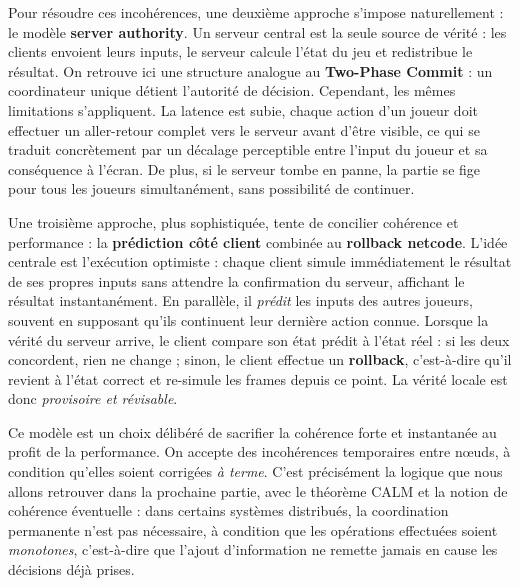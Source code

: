\documentclass[12pt,a4paper]{article}
\begin{document}
\vspace{0.25cm}

Pour résoudre ces incohérences, une deuxième approche s'impose naturellement : le modèle \textbf{server authority}\cite{Gambetta}. Un serveur central est la seule source de vérité : les clients envoient leurs inputs, le serveur calcule l'état du jeu et redistribue le résultat. On retrouve ici une structure analogue au \textbf{Two-Phase Commit} : un coordinateur unique détient l'autorité de décision. Cependant, les mêmes limitations s'appliquent. La latence est subie, chaque action d'un joueur doit effectuer un aller-retour complet vers le serveur avant d'être visible, ce qui se traduit concrètement
par un décalage perceptible entre l'input du joueur et sa conséquence à l'écran. De plus, si le serveur tombe en panne, la partie se fige pour tous les joueurs simultanément, sans possibilité de continuer\cite{Beigbeder2004}.

\vspace{0.25cm}

Une troisième approche, plus sophistiquée, tente de concilier cohérence et performance : la \textbf{prédiction côté client} combinée au \textbf{rollback netcode}\cite{GGPO2011}. L'idée centrale est l'exécution optimiste : chaque client simule immédiatement le résultat de ses propres inputs sans attendre la confirmation du serveur, affichant le résultat instantanément. En parallèle, il \textit{prédit} les inputs des autres joueurs, souvent en supposant qu'ils continuent leur dernière action connue. Lorsque la vérité du serveur arrive, le client compare son état prédit à l'état réel : si les deux concordent, rien ne change ; sinon, le client effectue un \textbf{rollback}, c'est-à-dire qu'il revient à l'état correct et re-simule les frames depuis ce point. La vérité locale est donc \textit{provisoire et révisable}\cite{Gambetta}.

\vspace{0.3cm}

Ce modèle est un choix délibéré de sacrifier la cohérence forte et instantanée au profit de la performance. On accepte des incohérences temporaires entre nœuds, à condition qu'elles soient corrigées \textit{à terme}. C'est précisément la logique que nous allons retrouver dans la prochaine partie, avec le théorème CALM et la notion de cohérence éventuelle : dans certains systèmes distribués, la coordination permanente n'est pas nécessaire, à condition que les opérations effectuées soient \textit{monotones}, c'est-à-dire que l'ajout d'information ne remette jamais en cause les décisions déjà prises.
\end{document}
